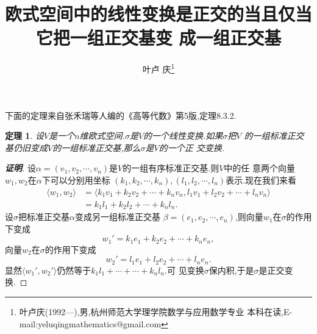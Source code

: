 ﻿\documentclass[a4paper]{article}
\newtheorem*{theo}{定理}
\newenvironment{theorem}
{\bigskip\begin{mdframed}\begin{theo}}
    {\end{theo}\end{mdframed}\bigskip}
\begin{document}
\title{\huge{\bf{欧式空间中的线性变换是正交的当且仅当它把一组正交基变
      成一组正交基}}} \author{\small{叶卢
    庆\footnote{叶卢庆(1992---),男,杭州师范大学理学院数学与应用数学专业
      本科在读,E-mail:yeluqingmathematics@gmail.com}}}
\maketitle\ni
下面的定理来自张禾瑞等人编的《高等代数》第5版,定理8.3.2.
\begin{theorem}
设$V$是一个$n$维欧式空间.$\sigma$是$V$的一个线性变换.如果$\sigma$把$V$
的一组标准正交基仍旧变成$V$的一组标准正交基,那么$\sigma$是$V$的一个正
交变换.  
\end{theorem}
\begin{proof}[\bf{证明}]
 设$\alpha=(v_1,v_2,\cdots,v_n)$是$V$的一组有序标准正交基.则$V$中的任
 意两个向量$w_1,w_2$在$\alpha$下可以分别用坐标
 $(k_1,k_2,\cdots,k_n),(l_1,l_2,\cdots,l_n)$表示.现在我们来看
\begin{align*}
\langle w_1,w_2\rangle&=\langle k_1v_1+k_2v_2+\cdots+k_nv_n,l_1v_1+l_2v_2+\cdots+l_nv_n\rangle\\&=k_1l_1+k_2l_2+\cdots+k_nl_n.
\end{align*}
设$\sigma$把标准正交基$\alpha$变成另一组标准正交基
$\beta=(e_1,e_2,\cdots,e_n)$,则向量$w_1$在$\sigma$的作用下变成
$$
w_1'=k_1e_1+k_2e_2+\cdots+k_ne_n,
$$
向量$w_2$在$\sigma$的作用下变成
$$
w_2'=l_1e_1+l_2e_2+\cdots+l_ne_n.
$$
显然$\langle w_1',w_2'\rangle$仍然等于$k_1l_1+\cdots+\cdots+k_nl_n$.可
见变换$\sigma$保内积,于是$\sigma$是正交变换.
\end{proof}
\end{document}

